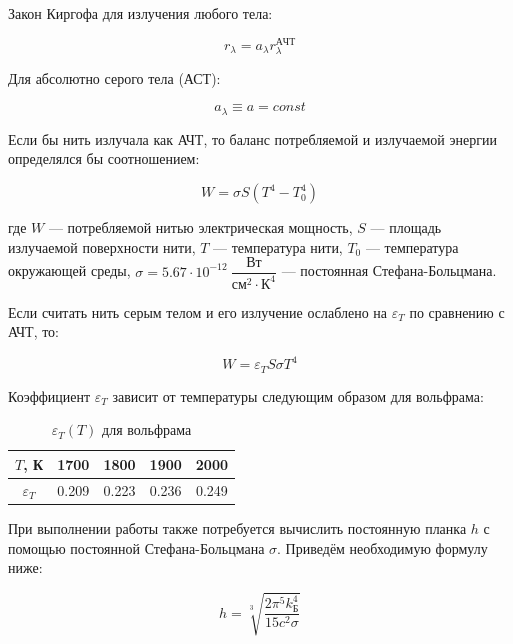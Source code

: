 \documentclass[a4paper, 12pt]{article}
\newcommand{\eps}{\varepsilon}
\begin{document}
Закон Киргофа для излучения любого тела:

\begin{equation}
    r_{\lambda} = a_{\lambda} r_{\lambda}^{АЧТ}
\end{equation}

Для абсолютно серого тела (АСТ):

\begin{equation}
    a_{\lambda} \equiv a = const
\end{equation}

Если бы нить излучала как АЧТ, то баланс потребляемой и излучаемой энергии определялся бы соотношением:

\begin{equation}
    W = \sigma S (T^4 - T_0^4)
\end{equation}

где $W$ --- потребляемой нитью электрическая мощность, $S$ --- площадь излучаемой поверхности нити, $T$ --- температура нити, $T_0$ --- температура окружающей среды, $\sigma = 5.67 \cdot 10^{-12} ~ \dfrac{Вт}{см^2 \cdot К^4}$ --- постоянная Стефана-Больцмана.

Если считать нить серым телом и его излучение ослаблено на $\eps_T$ по сравнению с АЧТ, то:

\begin{equation} \label{eq:s-b}
    W = \eps_T S \sigma T^4
\end{equation}

Коэффициент $\eps_T$ зависит от температуры следующим образом для вольфрама:

\begin{table}[!h]
    \centering
    \begin{tabular}{|c|c|c|c|c|}
        \hline
        $T$, К  &   1700 &  1800 &  1900 &  2000 \\ \hline
        $\eps_T$ & 0.209 & 0.223 & 0.236 & 0.249 \\ \hline
    \end{tabular}
    \caption {$\eps_T (T)$ для вольфрама}
    \label{tab:epsT}
\end{table}

При выполнении работы также потребуется вычислить постоянную планка $h$ с помощью постоянной Стефана-Больцмана $\sigma$. Приведём необходимую формулу ниже:

\begin{equation} \label{eq:h-sigma}
    h = \sqrt[3]{\frac{2 \pi^5 k_Б^4}{15 c^2 \sigma}}
\end{equation}
\end{document}
